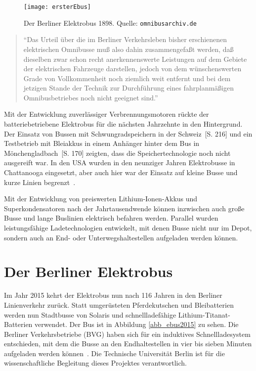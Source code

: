 \begin{figure}\centering
	\texttt{[image: ersterEbus]}
	\caption[Der Berliner Elektrobus 1898]{Der Berliner Elektrobus 1898. Quelle: \texttt{omnibusarchiv.de}}
	\label{abb_ersterEbus}
\end{figure}

\begin{quote}
	"`Das Urteil über die im Berliner Verkehrsleben bisher erschienenen elektrischen Omnibusse muß also dahin zusammengefaßt werden, daß dieselben zwar schon recht anerkennenswerte Leistungen auf dem Gebiete der elektrischen Fahrzeuge darstellen, jedoch von dem wünschenswerten Grade von Vollkommenheit noch ziemlich weit entfernt und bei dem jetzigen Stande der Technik zur Durchführung eines fahrplanmäßigen Omnibusbetriebes noch nicht geeignet sind."'~\cite{ersterEbus}
\end{quote}

Mit der Entwicklung zuverlässiger Verbrennungsmotoren rückte der batteriebetriebene Elektrobus für die nächsten Jahrzehnte in den Hintergrund. Der Einsatz von Bussen mit Schwungradspeichern in der Schweiz~\cite{tub_aleph001746639}[S. 216] und ein Testbetrieb mit Bleiakkus in einem Anhänger hinter dem Bus in Mönchengladbach~\cite{tub_aleph001746639}[S. 170] zeigten, dass die Speichertechnologie noch nicht ausgereift war. In den USA wurden in den neunziger Jahren Elektrobusse in Chattanooga eingesetzt, aber auch hier war der Einsatz auf kleine Busse und kurze Linien begrenzt~\cite{chattanoogaDOE}.

Mit der Entwicklung von preiswerten Lithium-Ionen-Akkus und Superkondensatoren nach der Jahrtausendwende können inzwischen auch große Busse und lange Buslinien elektrisch befahren werden. Parallel wurden leistungsfähige Ladetechnologien entwickelt, mit denen Busse nicht nur im Depot, sondern auch an End- oder Unterwegshaltestellen aufgeladen werden können.

\section{Der Berliner Elektrobus}
Im Jahr 2015 kehrt der Elektrobus nun nach 116 Jahren in den Berliner Linienverkehr zurück. Statt umgerüsteten Pferdekutschen und Bleibatterien werden nun Stadtbusse von Solaris und schnellladefähige Lithium-Titanat-Batterien verwendet. Der Bus ist in Abbildung \ref{abb_ebus2015} zu sehen. Die Berliner Verkehrsbetriebe (BVG) haben sich für ein induktives Schnellladesystem entschieden, mit dem die Busse an den Endhaltestellen in vier bis sieben Minuten aufgeladen werden können~\cite{ebus2015}. Die Technische Universität Berlin ist für die wissenschaftliche Begleitung dieses Projektes verantwortlich.


